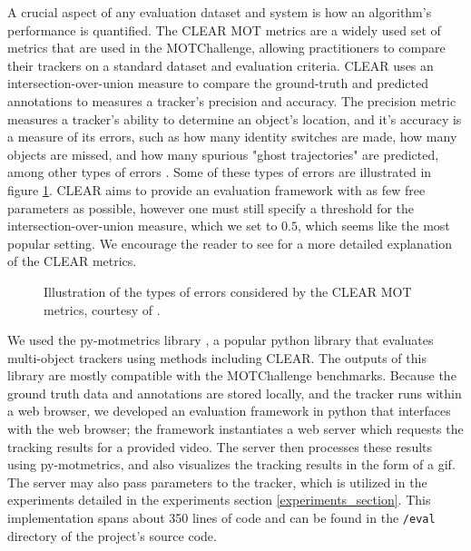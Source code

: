\documentclass[10pt,twocolumn,letterpaper]{article}
\begin{document}
A crucial aspect of any evaluation dataset and system is how an algorithm's performance is quantified. The CLEAR MOT metrics \cite{CLEARevaluation} are a widely used set of metrics that are used in the MOTChallenge, allowing practitioners to compare their trackers on a standard dataset and evaluation criteria. CLEAR uses an intersection-over-union measure to compare the ground-truth and predicted annotations to measures a tracker's precision and accuracy. The precision metric measures a tracker's ability to determine an object's location, and it's accuracy is a measure of its errors, such as how many identity switches are made, how many objects are missed, and how many spurious "ghost trajectories" are predicted, among other types of errors \cite{CLEARevaluation}. Some of these types of errors are illustrated in figure \ref{fig:CLEARMOT_illustration}. CLEAR aims to provide an evaluation framework with as few free parameters as possible, however one must still specify a threshold for the intersection-over-union measure, which we set to $0.5$, which seems like the most popular setting. We encourage the reader to see \cite{CLEARevaluation} for a more detailed explanation of the CLEAR metrics.

\begin{figure}%
    \centering
    \caption{Illustration of the types of errors considered by the CLEAR MOT metrics, courtesy of \cite{CLEARevaluation}.}%
    \label{fig:CLEARMOT_illustration}%
\end{figure}


We used the py-motmetrics library \cite{pymotmetrics}, a popular python library that evaluates multi-object trackers using methods including CLEAR. The outputs of this library are mostly compatible with the MOTChallenge benchmarks. Because the ground truth data and annotations are stored locally, and the tracker runs within a web browser, we developed an evaluation framework in python that interfaces with the web browser; the framework instantiates a web server which requests the tracking results for a provided video. The server then processes these results using py-motmetrics, and also visualizes the tracking results in the form of a gif. The server may also pass parameters to the tracker, which is utilized in the experiments detailed in the experiments section \ref{experiments_section}. This implementation spans about 350 lines of code and can be found in the \texttt{/eval} directory of the project's source code.
\end{document}
